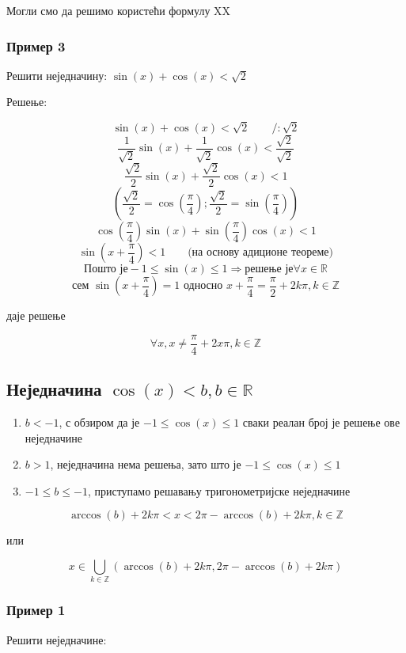\documentclass[a4paper,12pt]{article}
\begin{document}
Могли смо да решимо користећи формулу XX


\subsubsection{Пример 3}

Решити неједначину: $\sin(x)+\cos(x)<\sqrt{2}$

Решење:

\[\sin(x)+\cos(x)<\sqrt{2}\qquad/:\sqrt{2}\]
\[\frac{1}{\sqrt{2}}\sin(x)+\frac{1}{\sqrt{2}}\cos(x)<\frac{\sqrt{2}}{\sqrt{2}}\]
\[\frac{\sqrt{2}}{2}\sin(x)+\frac{\sqrt{2}}{2}\cos(x)<1\]
\[(\frac{\sqrt{2}}{2}=\cos(\frac{\pi}{4});\frac{\sqrt{2}}{2}=\sin(\frac{\pi}{4}))\]
\[\cos(\frac{\pi}{4})\sin(x)+\sin(\frac{\pi}{4})\cos(x)<1\]
\[\sin(x+\frac{\pi}{4})<1\qquad\text{(на основу адиционе теореме)}\]
\[\text{Пошто је} -1\leqslant\sin(x)\leqslant1\Rightarrow \text{решење је} \forall x\in\mathbb{R}\]
\[\text{сем } \sin\left(x+\frac{\pi}{4}\right)=1\text{ односно }x+\frac{\pi}{4}=\frac{\pi}{2}+2k\pi,k\in\mathbb{Z}\]
\centerline{даје решење}
\[\forall x,x\neq\frac{\pi}{4}+2x\pi,k\in\mathbb{Z}\]



\subsection{Неједначина $\cos(x)<b,b\in\mathbb{R}$}

\begin{enumerate}[label=\alph*)]
\item $b<-1$, с обзиром да је $-1\leq\cos(x)\leq1$ сваки реалан број је решење ове неједначине
\item $b>1$, неједначина нема решења, зато што је $-1\leq\cos(x)\leq1$
\item $-1\leq b\leq-1$, приступамо решавању тригонометријске неједначине
\end{enumerate}

\[\arccos(b)+2k\pi<x<2\pi-\arccos(b)+2k\pi,k\in\mathbb{Z}\]
\centerline{или}
\[x\in\bigcup_{k\in\mathbb{Z}}\left(\arccos(b)+2k\pi,2\pi-\arccos(b)+2k\pi\right)\]


\subsubsection{Пример 1}

Решити неједначине:
\end{document}
